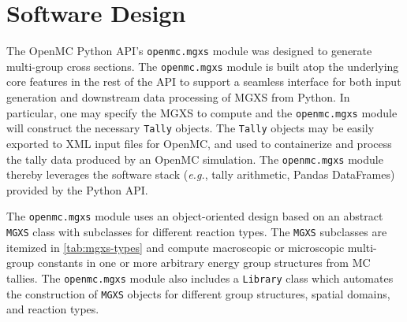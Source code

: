 \section{Software Design}
\label{sec:software}

The OpenMC Python API's \texttt{openmc.mgxs} module was designed to generate multi-group cross sections. The \texttt{openmc.mgxs} module is built atop the underlying core features in the rest of the API to support a seamless interface for both input generation and downstream data processing of MGXS from Python. In particular, one may specify the MGXS to compute and the \texttt{openmc.mgxs} module will construct the necessary \texttt{Tally} objects. The \texttt{Tally} objects may be easily exported to XML input files for OpenMC, and used to containerize and process the tally data produced by an OpenMC simulation. The \texttt{openmc.mgxs} module thereby leverages the software stack (\textit{e.g.}, tally arithmetic, Pandas DataFrames) provided by the Python API.

The \texttt{openmc.mgxs} module uses an object-oriented design based on an abstract \texttt{MGXS} class with subclasses for different reaction types. The \texttt{MGXS} subclasses are itemized in \autoref{tab:mgxs-types} and compute macroscopic or microscopic multi-group constants in one or more arbitrary energy group structures from MC tallies. The \texttt{openmc.mgxs} module also includes a \texttt{Library} class which automates the construction of \texttt{MGXS} objects for different group structures, spatial domains, and reaction types.

